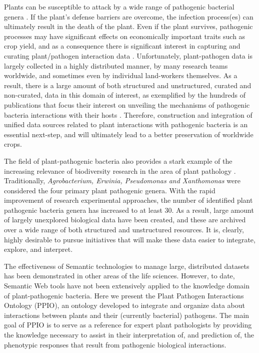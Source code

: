 \documentclass[sw]{iosart2c}
\begin{document}
Plants can be susceptible to attack by a wide range of pathogenic bacterial genera \cite{Mansfield}. If the plant's defense barriers are overcome, the infection process(es) can ultimately result in the death of the plant. Even if the plant survives, pathogenic processes may have significant effects on economically important traits such as crop yield, and as a consequence there is significant interest in capturing and curating plant/pathogen interaction data \cite{Montesinos}. Unfortunately, plant-pathogen data is largely collected in a highly distributed manner, by many research teams worldwide, and sometimes even by individual land-workers themselves. As a result, there is a large amount of both structured and unstructured, curated and non-curated, data in this domain of interest, as exemplified by the hundreds of publications that focus their interest on unveiling the mechanisms of pathogenic bacteria interactions with their hosts \cite{DeWit} \cite {Dodds}. Therefore, construction and integration of unified data sources related to plant interactions with pathogenic bacteria is an essential next-step, and will ultimately lead to a better preservation of worldwide crops.

The field of plant-pathogenic bacteria also provides a stark example of the increasing relevance of biodiversity research in the area of plant pathology \cite{Bull2010}. Traditionally, {\itshape Agrobacterium, Erwinia, Pseudomonas and Xanthomonas} were considered the four primary plant pathogenic genera. With the rapid improvement of research experimental approaches, the number of identified plant pathogenic bacteria genera has increased to at least 30. As a result, large amount of largely unexplored biological data have been created, and these are archived over a wide range of both structured and unstructured resources. It is, clearly, highly desirable to pursue initiatives that will make these data easier to integrate, explore, and interpret.

The effectiveness of Semantic technologies to manage large, distributed datasets has been demonstrated in other areas of the life sciences. However, to date, Semantic Web tools have not been extensively applied to the knowledge domain of plant-pathogenic bacteria. Here we present the Plant Pathogen Interactions Ontology (PPIO), an ontology developed to integrate and organize data about interactions between plants and their (currently bacterial) pathogens. The main goal of PPIO is to serve as a reference for expert plant pathologists by providing the knowledge necessary to assist in their interpretation of, and prediction of, the phenotypic responses that result from pathogenic biological interactions.
\end{document}
